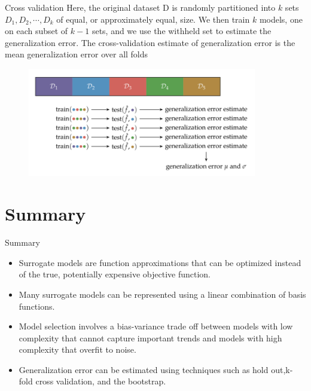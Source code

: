 \documentclass{beamer}
\begin{document}
\begin{frame}{Cross validation}
Here, the original dataset D is randomly partitioned into $k$ sets $D_1, D_2, \cdots, D_k$ of equal, or approximately equal, size. We then train $k$ models, one on each subset of $k-1$ sets, and we use the withheld set to estimate the generalization error. The cross-validation estimate of generalization error is the mean generalization error over all folds   
\begin{figure}
\centering
\includegraphics[width=100mm]{Figs/cross-valid.jpeg}
\end{figure} 
\end{frame}

\section{Summary}
\begin{frame}{Summary}
    \begin{itemize}
        \item Surrogate models are function approximations that can be optimized instead of the true, potentially expensive objective function.
        \item Many surrogate models can be represented using a linear combination of basis functions.
        \item Model selection involves a bias-variance trade off between models with low complexity that cannot capture important trends and models with high complexity that overfit to noise.
        \item Generalization error can be estimated using techniques such as hold out,k-fold cross validation, and the bootstrap.
    \end{itemize}
\end{frame}
\end{document}
